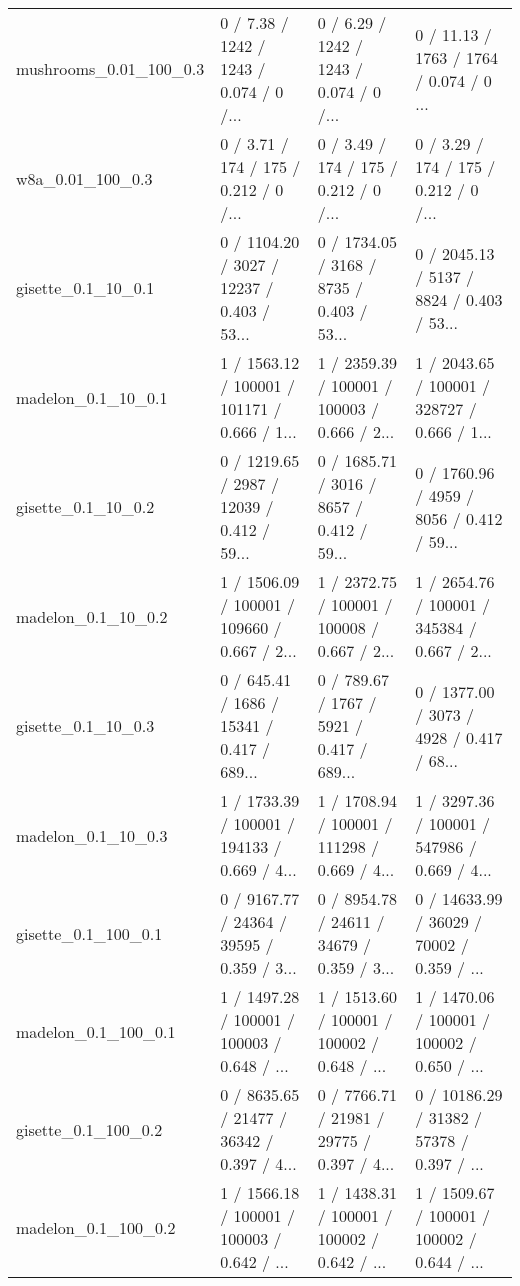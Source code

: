 \begin{tabular}{llll}
    mushrooms\_0.01\_100\_0.3 &  0 / 7.38 /   1242 /    1243 / 0.074 /      0 /... &  0 / 6.29 /   1242 /    1243 / 0.074 /      0 /... &  0 / 11.13 /   1763 /    1764 / 0.074 /      0 ... \\
          w8a\_0.01\_100\_0.3 &  0 / 3.71 /    174 /     175 / 0.212 /      0 /... &  0 / 3.49 /    174 /     175 / 0.212 /      0 /... &  0 / 3.29 /    174 /     175 / 0.212 /      0 /... \\
        gisette\_0.1\_10\_0.1 &  0 / 1104.20 /   3027 /   12237 / 0.403 /    53... &  0 / 1734.05 /   3168 /    8735 / 0.403 /    53... &  0 / 2045.13 /   5137 /    8824 / 0.403 /    53... \\
        madelon\_0.1\_10\_0.1 &  1 / 1563.12 / 100001 /  101171 / 0.666 /     1... &  1 / 2359.39 / 100001 /  100003 / 0.666 /     2... &  1 / 2043.65 / 100001 /  328727 / 0.666 /     1... \\
        gisette\_0.1\_10\_0.2 &  0 / 1219.65 /   2987 /   12039 / 0.412 /    59... &  0 / 1685.71 /   3016 /    8657 / 0.412 /    59... &  0 / 1760.96 /   4959 /    8056 / 0.412 /    59... \\
        madelon\_0.1\_10\_0.2 &  1 / 1506.09 / 100001 /  109660 / 0.667 /     2... &  1 / 2372.75 / 100001 /  100008 / 0.667 /     2... &  1 / 2654.76 / 100001 /  345384 / 0.667 /     2... \\
        gisette\_0.1\_10\_0.3 &  0 / 645.41 /   1686 /   15341 / 0.417 /    689... &  0 / 789.67 /   1767 /    5921 / 0.417 /    689... &  0 / 1377.00 /   3073 /    4928 / 0.417 /    68... \\
        madelon\_0.1\_10\_0.3 &  1 / 1733.39 / 100001 /  194133 / 0.669 /     4... &  1 / 1708.94 / 100001 /  111298 / 0.669 /     4... &  1 / 3297.36 / 100001 /  547986 / 0.669 /     4... \\
       gisette\_0.1\_100\_0.1 &  0 / 9167.77 /  24364 /   39595 / 0.359 /     3... &  0 / 8954.78 /  24611 /   34679 / 0.359 /     3... &  0 / 14633.99 /  36029 /   70002 / 0.359 /     ... \\
       madelon\_0.1\_100\_0.1 &  1 / 1497.28 / 100001 /  100003 / 0.648 /      ... &  1 / 1513.60 / 100001 /  100002 / 0.648 /      ... &  1 / 1470.06 / 100001 /  100002 / 0.650 /      ... \\
       gisette\_0.1\_100\_0.2 &  0 / 8635.65 /  21477 /   36342 / 0.397 /     4... &  0 / 7766.71 /  21981 /   29775 / 0.397 /     4... &  0 / 10186.29 /  31382 /   57378 / 0.397 /     ... \\
       madelon\_0.1\_100\_0.2 &  1 / 1566.18 / 100001 /  100003 / 0.642 /      ... &  1 / 1438.31 / 100001 /  100002 / 0.642 /      ... &  1 / 1509.67 / 100001 /  100002 / 0.644 /      ... \\

\end{tabular}
